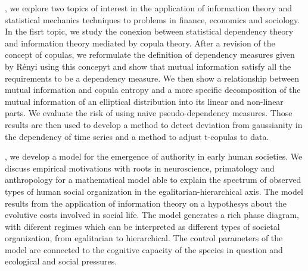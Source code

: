 , we explore two topics of interest in the application of information theory and statistical mechanics techniques to problems in finance, economics and sociology. In the fisrt topic, we study the conexion between statistical dependency theory and information theory mediated by copula theory. After a revision of the concept of copulas, we reformulate the definition of dependency measures given by Rényi \citep{Renyi1959} using this concepyt and show that mutual information satisfy all the requirements to be a dependency measure. We then show a relationship between mutual information and copula entropy and a more specific decomposition of the mutual information of an elliptical distribution into its linear and non-linear parts. We evaluate the risk of using naive pseudo-dependency measures. Those results are then used to develop a method to detect deviation from gaussianity in the dependency of time series and a method to adjust t-copulas to data\citep{Calsaverini2009}.

, we develop a model for the emergence of authority in early human societies. We discuss empirical motivations with roots in neuroscience, primatology and anthropology for a mathematical model able to explain the spectrum of observed types of human social organization in the egalitarian-hierarchical axis. The model results from the application of information theory on a hypothesys about the evolutive costs involved in social life. The model generates a rich phase diagram, with diferent regimes which can be interpreted as different types of societal organization, from egalitarian to hierarchical. The control parameters of the model are connected to the cognitive capacity of the species in question and ecological and social pressures.